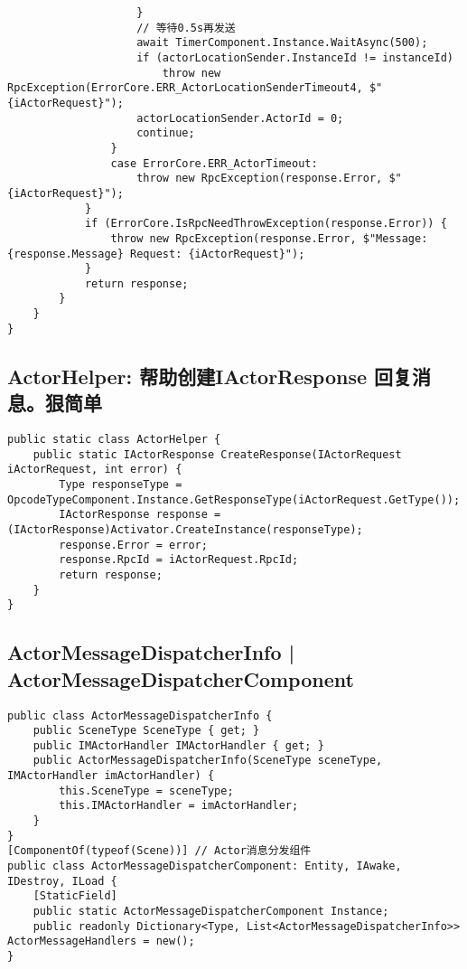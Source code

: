 \documentclass[9pt, b5paper]{article}
\begin{document}
\begin{verbatim}
                    }
                    // 等待0.5s再发送
                    await TimerComponent.Instance.WaitAsync(500);
                    if (actorLocationSender.InstanceId != instanceId)
                        throw new RpcException(ErrorCore.ERR_ActorLocationSenderTimeout4, $"{iActorRequest}");
                    actorLocationSender.ActorId = 0;
                    continue;
                }
                case ErrorCore.ERR_ActorTimeout: 
                    throw new RpcException(response.Error, $"{iActorRequest}");
            }
            if (ErrorCore.IsRpcNeedThrowException(response.Error)) {
                throw new RpcException(response.Error, $"Message: {response.Message} Request: {iActorRequest}");
            }
            return response;
        }
    }
}
\end{verbatim}
\subsection{ActorHelper: 帮助创建IActorResponse 回复消息。狠简单}
\label{sec-1-9}
\begin{verbatim}
public static class ActorHelper {
    public static IActorResponse CreateResponse(IActorRequest iActorRequest, int error) {
        Type responseType = OpcodeTypeComponent.Instance.GetResponseType(iActorRequest.GetType());
        IActorResponse response = (IActorResponse)Activator.CreateInstance(responseType);
        response.Error = error;
        response.RpcId = iActorRequest.RpcId;
        return response;
    }
}
\end{verbatim}
\subsection{ActorMessageDispatcherInfo | ActorMessageDispatcherComponent}
\label{sec-1-10}
\begin{verbatim}
public class ActorMessageDispatcherInfo {
    public SceneType SceneType { get; }
    public IMActorHandler IMActorHandler { get; }
    public ActorMessageDispatcherInfo(SceneType sceneType, IMActorHandler imActorHandler) {
        this.SceneType = sceneType;
        this.IMActorHandler = imActorHandler;
    }
}
[ComponentOf(typeof(Scene))] // Actor消息分发组件
public class ActorMessageDispatcherComponent: Entity, IAwake, IDestroy, ILoad {
    [StaticField]
    public static ActorMessageDispatcherComponent Instance;
    public readonly Dictionary<Type, List<ActorMessageDispatcherInfo>> ActorMessageHandlers = new();
}
\end{verbatim}
\end{document}

